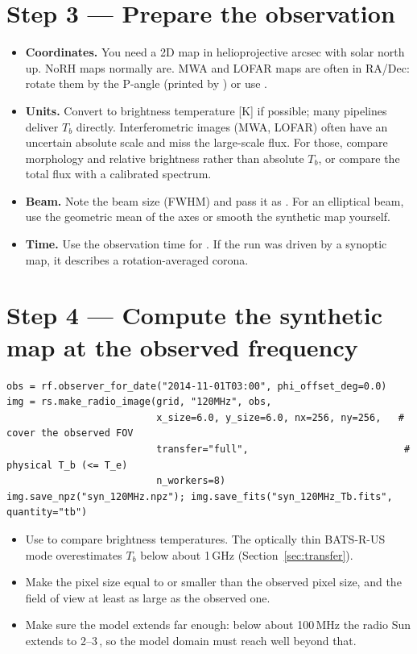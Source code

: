 \section*{Step 3 --- Prepare the observation}
\begin{itemize}[itemsep=2pt]
\item \textbf{Coordinates.} You need a 2D map in helioprojective arcsec with solar north
      up. NoRH maps normally are. MWA and LOFAR maps are often in RA/Dec: rotate them by
      the P-angle (printed by ) or use
      .
\item \textbf{Units.} Convert to brightness temperature [K] if possible; many pipelines
      deliver $T_b$ directly. Interferometric images (MWA, LOFAR) often have an uncertain
      absolute scale and miss the large-scale flux. For those, compare morphology and
      relative brightness rather than absolute $T_b$, or compare the total flux with a
      calibrated spectrum.
\item \textbf{Beam.} Note the beam size (FWHM) and pass it as .
      For an elliptical beam, use the geometric mean of the axes or smooth the synthetic
      map yourself.
\item \textbf{Time.} Use the observation time for . If the run
      was driven by a synoptic map, it describes a rotation-averaged corona.
\end{itemize}

\section*{Step 4 --- Compute the synthetic map at the observed frequency}
\begin{lstlisting}[style=pyex]
obs = rf.observer_for_date("2014-11-01T03:00", phi_offset_deg=0.0)
img = rs.make_radio_image(grid, "120MHz", obs,
                          x_size=6.0, y_size=6.0, nx=256, ny=256,   # cover the observed FOV
                          transfer="full",                           # physical T_b (<= T_e)
                          n_workers=8)
img.save_npz("syn_120MHz.npz"); img.save_fits("syn_120MHz_Tb.fits", quantity="tb")
\end{lstlisting}
\begin{itemize}[itemsep=1pt]
\item Use  to compare brightness temperatures. The optically thin
      BATS-R-US mode overestimates $T_b$ below about 1\,GHz (Section~\ref{sec:transfer}).
\item Make the pixel size equal to or smaller than the observed pixel size, and the
      field of view at least as large as the observed one.
\item Make sure the model extends far enough: below about 100\,MHz the radio Sun extends
      to 2--3\,\rsun, so the model domain must reach well beyond that.
\end{itemize}

